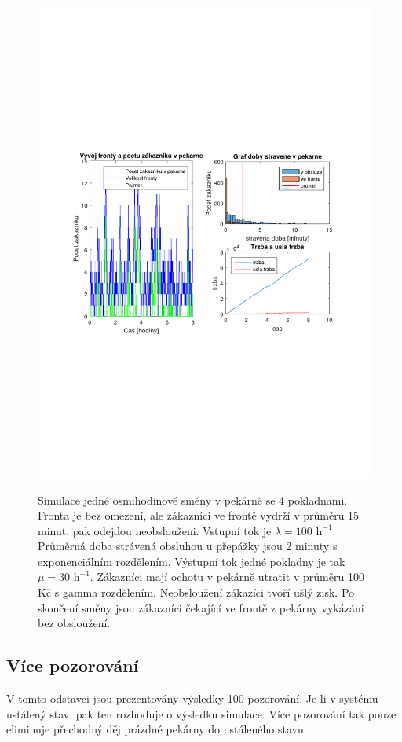 \documentclass[a4paper,12pt]{article}
\begin{document}
\begin{figure}
\centering
\includegraphics[width=0.99\columnwidth]{jedenPrubeh4.pdf}
\label{fig:jedenPrubeh4}
\caption{Simulace jedné osmihodinové směny v pekárně se 4 pokladnami. Fronta je bez omezení, ale zákazníci ve frontě 
vydrží v průměru 15 minut, pak odejdou neobslouženi. Vstupní tok je \(\lambda = 100 \mbox{~h}^{-1}\). 
Průměrná doba strávená obsluhou u přepážky jsou 2 minuty s exponenciálním rozdělením. Výstupní tok 
jedné pokladny je tak \(\mu = 30 \mbox{~h}^{-1}\). Zákazníci mají ochotu v pekárně utratit v průměru 100 Kč s gamma rozdělením. 
Neobsloužení zákazíci tvoří ušlý zisk. Po skončení směny jsou zákazníci čekající ve frontě z pekárny vykázáni bez obsloužení.}
\end{figure}

\subsection{Více pozorování}
V tomto odstavci jsou prezentovány výsledky 100 pozorování. Je-li v systému ustálený stav, pak ten rozhoduje o výsledku simulace. 
Více pozorování tak pouze eliminuje přechodný děj prázdné pekárny do ustáleného stavu. 
\end{document}
